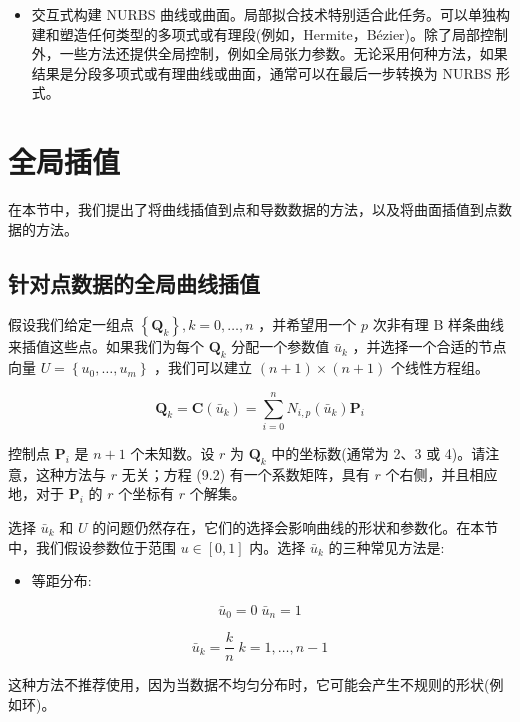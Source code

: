 \documentclass[../main.tex]{subfiles}
\begin{document}
\begin{itemize}
\item 交互式构建 NURBS 曲线或曲面。局部拟合技术特别适合此任务。可以单独构建和塑造任何类型的多项式或有理段(例如，Hermite，Bézier)。除了局部控制外，一些方法还提供全局控制，例如全局张力参数。无论采用何种方法，如果结果是分段多项式或有理曲线或曲面，通常可以在最后一步转换为 NURBS 形式。
\end{itemize}


\section{全局插值}
在本节中，我们提出了将曲线插值到点和导数数据的方法，以及将曲面插值到点数据的方法。

\subsection{针对点数据的全局曲线插值}%
假设我们给定一组点 \(\left\{  {\mathbf{Q}}_{k}\right\}  ,k = 0,\ldots ,n\) ，并希望用一个 \(p\) 次非有理 B 样条曲线来插值这些点。如果我们为每个 \({\mathbf{Q}}_{k}\) 分配一个参数值 \({\bar{u}}_{k}\) ，并选择一个合适的节点向量 \(U = \left\{  {{u}_{0},\ldots ,{u}_{m}}\right\}\) ，我们可以建立 \(\left( {n + 1}\right)  \times  \left( {n + 1}\right)\) 个线性方程组。

\[
{\mathbf{Q}}_{k} = \mathbf{C}\left( {\bar{u}}_{k}\right)  = \mathop{\sum }\limits_{{i = 0}}^{n}{N}_{i,p}\left( {\bar{u}}_{k}\right) {\mathbf{P}}_{i} \tag{9.2}
\]

控制点 \({\mathbf{P}}_{i}\) 是 \(n + 1\) 个未知数。设 \(r\) 为 \({\mathbf{Q}}_{k}\) 中的坐标数(通常为 2、3 或 4)。请注意，这种方法与 \(r\) 无关；方程 (9.2) 有一个系数矩阵，具有 \(r\) 个右侧，并且相应地，对于 \({\mathbf{P}}_{i}\) 的 \(r\) 个坐标有 \(r\) 个解集。

选择 \({\bar{u}}_{k}\) 和 \(U\) 的问题仍然存在，它们的选择会影响曲线的形状和参数化。在本节中，我们假设参数位于范围 \(u \in  \left\lbrack  {0,1}\right\rbrack\) 内。选择 \({\bar{u}}_{k}\) 的三种常见方法是:

\begin{itemize}
\item 等距分布:
\end{itemize}

\[
{\bar{u}}_{0} = 0\;{\bar{u}}_{n} = 1
\]

\[
{\bar{u}}_{k} = \frac{k}{n}\;k = 1,\ldots ,n - 1 \tag{9.3}
\]

这种方法不推荐使用，因为当数据不均匀分布时，它可能会产生不规则的形状(例如环)。
\end{document}

